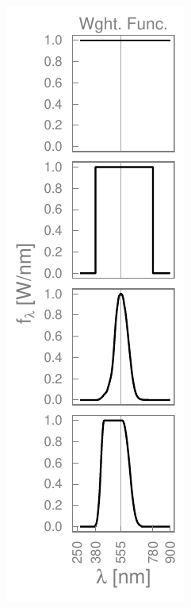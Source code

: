 \documentclass[energies,article,accept,moreauthors,pdftex]{Definitions/mdpi}\usepackage[]{graphicx}\usepackage[]{color}
\makeatletter
\def\maxwidth{ %
  \ifdim\Gin@nat@width>\linewidth
    \linewidth
  \else
    \Gin@nat@width
  \fi
}
\newenvironment{knitrout}{}{} %
\makeatother
\begin{document}
\begin{figure}[H]
\begin{subfigure}[t]{0.74\textwidth}
\begin{knitrout}
\end{knitrout}
      \label{fig:lamp_exergy}
    \end{subfigure}
    \begin{subfigure}[t]{0.25\textwidth}
\begin{knitrout}
\color{fgcolor}
\includegraphics[width=\maxwidth]{figure/Weighting_Function_Graph_Energy-1} 

\end{knitrout}
        \label{fig:weighting_functions}
    \end{subfigure}
    \begin{subfigure}[t]{0.74\textwidth}
\begin{knitrout}
\color{fgcolor}


\end{knitrout}
\end{subfigure}
\end{figure}
\end{document}
